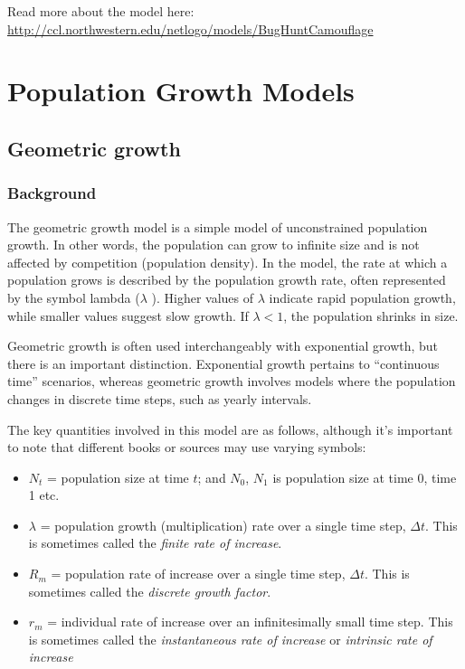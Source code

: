 \documentclass[
  a4paper]{book}
\providecommand{\tightlist}{%
  \setlength{\itemsep}{0pt}\setlength{\parskip}{0pt}}
\begin{document}
Read more about the model here: \url{http://ccl.northwestern.edu/netlogo/models/BugHuntCamouflage}

\part{Population Growth Models}\label{part-population-growth-models}

\chapter{Geometric growth}\label{geometric-growth}

\section{Background}\label{background-2}

The geometric growth model is a simple model of unconstrained population growth. In other words, the population can grow to infinite size and is not affected by competition (population density). In the model, the rate at which a population grows is described by the population growth rate, often represented by the symbol lambda (\(\lambda\) ). Higher values of \(\lambda\) indicate rapid population growth, while smaller values suggest slow growth. If \(\lambda < 1\), the population shrinks in size.

Geometric growth is often used interchangeably with exponential growth, but there is an important distinction. Exponential growth pertains to ``continuous time'' scenarios, whereas geometric growth involves models where the population changes in discrete time steps, such as yearly intervals.

The key quantities involved in this model are as follows, although it's important to note that different books or sources may use varying symbols:

\begin{itemize}
\tightlist
\item
  \(N_t\) = population size at time \(t\); and \(N_0\), \(N_1\) is population size at time 0, time 1 etc.
\item
  \(\lambda\) = population growth (multiplication) rate over a single time step, \(\Delta t\). This is sometimes called the \emph{finite rate of increase}.
\item
  \(R_m\) = population rate of increase over a single time step, \(\Delta t\). This is sometimes called the \emph{discrete growth factor}.
\item
  \(r_m\) = individual rate of increase over an infinitesimally small time step. This is sometimes called the \emph{instantaneous rate of increase} or \emph{intrinsic rate of increase}
\end{itemize}
\end{document}
